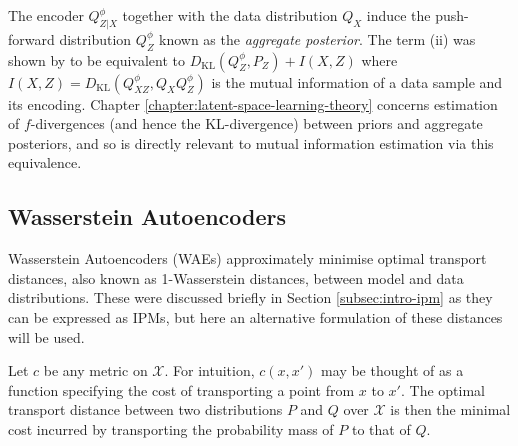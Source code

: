The encoder $Q^\phi_{Z|X}$ together with the data distribution $Q_X$ induce the push-forward distribution $Q^\phi_Z$ known as the \emph{aggregate posterior}.
The term (ii) was shown by \cite{hoffman2016elbo} to be equivalent to $D_{\text{KL}}(Q^\phi_Z , P_Z) + I(X,Z)$ where $I(X,Z) = D_{\text{KL}}(Q^\phi_{XZ} , Q_XQ^\phi_{Z})$ is the mutual information of a data sample and its encoding.
Chapter \ref{chapter:latent-space-learning-theory} concerns estimation of $f$-divergences (and hence the KL-divergence) between priors and aggregate posteriors, and so is directly relevant to mutual information estimation via this equivalence.





\subsection{Wasserstein Autoencoders}

Wasserstein Autoencoders (WAEs) \citep{tolstikhin2017wasserstein} approximately minimise optimal transport distances, also known as 1-Wasserstein distances, between model and data distributions.
These were discussed briefly in Section \ref{subsec:intro-ipm} as they can be expressed as IPMs, but here an alternative formulation of these distances will be used.

Let $c$ be any metric on $\mathcal{X}$.
For intuition, $c(x, x')$ may be thought of as a function specifying the cost of transporting a point from $x$ to $x'$.
The optimal transport distance between two distributions $P$ and $Q$ over $\mathcal{X}$ is then the minimal cost incurred by transporting the probability mass of $P$ to that of $Q$.

